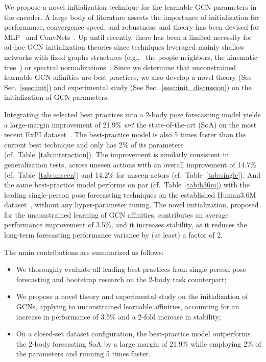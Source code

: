 \documentclass[10pt,twocolumn,letterpaper]{article}
\begin{document}
We propose a novel initialization technique for the learnable GCN parameters in the encoder. 
A large body of literature asserts the importance of initialization for performance, convergence speed, and robustness, and theory has been devised for MLP~\cite{glorot10} and ConvNets~\cite{he15, Krhenbhl2016}.
Up until recently, there has been a limited necessity for ad-hoc GCN initialization theories since techniques leveraged mainly shallow networks with fixed graphs structures (e.g., \ the people neighbors\cite{Atwood16, Li18, tong20}, the kinematic tree~\cite{yan18, Dang21}) or spectral normalizations~\cite{kipf17, kipf18nri}.
Since we determine that unconstrained learnable GCN affinities are best practices, we also develop a novel theory (See Sec.~\ref{ssec:init}) and experimental study (See Sec.~\ref{ssec:init_discussion}) on the initialization of GCN parameters.

Integrating the selected best practices into a 2-body pose forecasting model yields a large-margin improvement of 21.9\% \emph{wrt} the state-of-the-art (SoA) on the most recent ExPI dataset~\cite{guo21}.
The best-practice model is also 5 times faster than the current best technique and only has 2\% of its parameters (cf.\ Table~\ref{tab:interaction}).
The improvement is similarly consistent in generalization tests, across unseen actions with an overall improvement of 14.7\% (cf.\ Table~\ref{tab:unseen}) and 14.2\% for unseen actors (cf.\ Table~\ref{tab:single}). 
And the same best-practice model performs on par (cf.\ Table~\ref{tab:h36m}) with the leading single-person pose forecasting techniques on the established Human3.6M dataset~\cite{h36m}, without any hyper-parameter tuning.
The novel initialization, proposed for the unconstrained learning of GCN affinities, contributes an average performance improvement of 3.5\%, and it increases stability, as it reduces the long-term forecasting performance variance by (at least) a factor of 2.

The main contributions are summarized as follows:
\begin{itemize}
    \item We thoroughly evaluate all leading best practices from single-person pose forecasting and bootstrap research on the 2-body task counterpart;
    \item We propose a novel theory and experimental study on the initialization of GCNs, applying to unconstrained learnable affinities, accounting for an increase in performance of 3.5\% and a 2-fold increase in stability;
    \item On a closed-set dataset configuration, the best-practice model outperforms the 2-body forecasting SoA by a large margin of 21.9\% while employing 2\% of the parameters and running 5 times faster.
\end{itemize}
 
\end{document}
